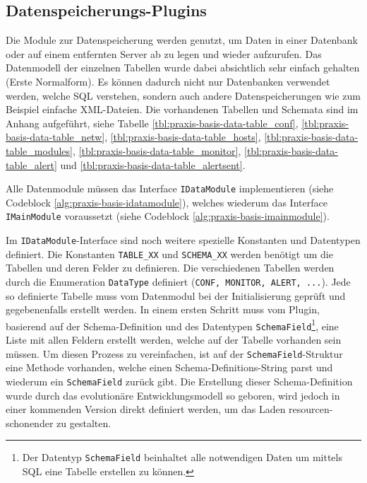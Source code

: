 \subsection{Datenspeicherungs-Plugins} \label{sec:praxis-basis-data}
Die Module zur Datenspeicherung werden genutzt, um Daten in einer Datenbank oder auf einem entfernten Server ab zu legen und wieder aufzurufen. Das Datenmodell der einzelnen Tabellen wurde dabei absichtlich sehr einfach gehalten (Erste Normalform). Es k\"onnen dadurch nicht nur Datenbanken verwendet werden, welche SQL verstehen, sondern auch andere Datenspeicherungen wie zum Beispiel einfache XML-Dateien. Die vorhandenen Tabellen und Schemata sind im Anhang aufgef\"uhrt, siehe Tabelle \ref{tbl:praxis-basis-data-table_conf}, \ref{tbl:praxis-basis-data-table_netw}, \ref{tbl:praxis-basis-data-table_hosts}, \ref{tbl:praxis-basis-data-table_modules}, \ref{tbl:praxis-basis-data-table_monitor}, \ref{tbl:praxis-basis-data-table_alert} und \ref{tbl:praxis-basis-data-table_alertsent}.

Alle Datenmodule m\"ussen das Interface \texttt{IDataModule} implementieren (siehe Codeblock \ref{alg:praxis-basis-idatamodule}), welches wiederum das Interface \texttt{IMainModule} voraussetzt (siehe Codeblock \ref{alg:praxis-basis-imainmodule}).

Im \texttt{IDataModule}-Interface sind noch weitere spezielle Konstanten und Datentypen definiert. Die Konstanten \texttt{TABLE\_XX} und \texttt{SCHEMA\_XX} werden ben\"otigt um die Tabellen und deren Felder zu definieren. Die verschiedenen Tabellen werden durch die Enumeration \texttt{DataType} definiert (\texttt{CONF, MONITOR, ALERT, ...}). Jede so definierte Tabelle muss vom Datenmodul bei der Initialisierung gepr\"uft und gegebenenfalls erstellt werden. In einem ersten Schritt muss vom Plugin, basierend auf der Schema-Definition und des Datentypen \texttt{SchemaField}\footnote{Der Datentyp \texttt{SchemaField} beinhaltet alle notwendigen Daten um mittels SQL eine Tabelle erstellen zu k\"onnen.}, eine Liste mit allen Feldern erstellt werden, welche auf der Tabelle vorhanden sein m\"ussen. Um diesen Prozess zu vereinfachen, ist auf der \texttt{SchemaField}-Struktur eine Methode vorhanden, welche einen Schema-Definitions-String parst und wiederum ein \texttt{SchemaField} zur\"uck gibt. Die Erstellung dieser Schema-Definition wurde durch das evolution\"are Entwicklungsmodell so geboren, wird jedoch in einer kommenden Version direkt definiert werden, um das Laden resourcen-schonender zu gestalten.

